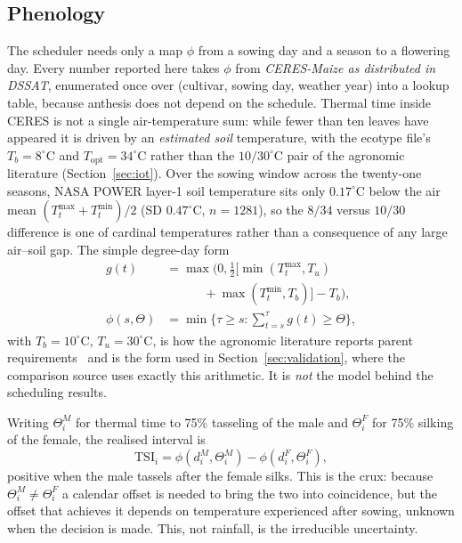 \documentclass[10pt,twocolumn]{article}
\newcommand{\TSI}{\mathrm{TSI}}
\begin{document}
\subsection{Phenology}

The scheduler needs only a map $\phi$ from a sowing day and a season to a
flowering day. Every number reported here takes $\phi$ from
\emph{CERES-Maize as distributed in DSSAT}, enumerated once over (cultivar,
sowing day, weather year) into a lookup table, because anthesis does not
depend on the schedule. Thermal time inside CERES is not a single
air-temperature sum: while fewer than ten leaves have appeared it is driven
by an \emph{estimated soil} temperature, with the ecotype file's
$T_b = 8^\circ$C and $T_{\mathrm{opt}} = 34^\circ$C rather than the
$10/30^\circ$C pair of the agronomic literature
(Section~\ref{sec:iot}). Over the sowing window across the twenty-one
seasons, NASA POWER layer-1 soil temperature sits only $0.17^\circ$C below
the air mean $(T^{\max}_t + T^{\min}_t)/2$ (SD $0.47^\circ$C, $n = 1281$),
so the $8/34$ versus $10/30$ difference is one of cardinal temperatures
rather than a consequence of any large air--soil gap. The simple degree-day form
\begin{equation}
\begin{aligned}
g(t) &= \max\!\Big(0, \tfrac{1}{2}\big[\min(T^{\max}_t, T_u)\\
     &\qquad\quad + \max(T^{\min}_t, T_b)\big] - T_b\Big),\\
\phi(s,\Theta) &= \min\Big\{\tau \ge s : \textstyle\sum_{t=s}^{\tau} g(t) \ge \Theta\Big\},
\end{aligned}
\label{eq:gdd}
\end{equation}
with $T_b = 10^\circ$C, $T_u = 30^\circ$C, is how the agronomic literature
reports parent requirements~\cite{marahatta2025,chassaigne2021} and is the
form used in Section~\ref{sec:validation}, where the comparison source uses
exactly this arithmetic. It is \emph{not} the model behind the scheduling
results.

Writing $\Theta^M_i$ for thermal time to 75\% tasseling of the male and
$\Theta^F_i$ for 75\% silking of the female, the realised interval is
\begin{equation}
\TSI_i = \phi(d^M_i, \Theta^M_i) - \phi(d^F_i, \Theta^F_i),
\label{eq:tsi}
\end{equation}
positive when the male tassels after the female silks. This is the crux:
because $\Theta^M_i \ne \Theta^F_i$ a calendar offset is needed to bring the
two into coincidence, but the offset that achieves it depends on temperature
experienced after sowing, unknown when the decision is made. This, not
rainfall, is the irreducible uncertainty.
\end{document}

